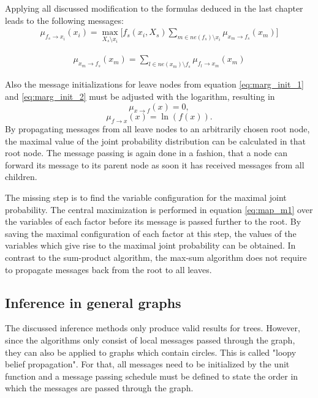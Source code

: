 \documentclass{sigkdd}
\begin{document}
Applying all discussed modification to the formulas deduced in the last chapter leads to the following messages:
\begin{equation}\label{eq:map_m1}
\begin{split}
\mu_{f_s \rightarrow x_i}(x_i) = \max_{X_s \setminus x_i} \Big[f_s(x_i, X_s) \sum_{m \in ne(f_s) \setminus x_i} \mu_{x_m \rightarrow f_s}(x_m) \Big]
\end{split}
\end{equation}

\begin{equation}\label{eq:map_m2}
\begin{split}
\mu_{x_m \rightarrow f_s}(x_m) = \sum_{l \in ne(x_m) \setminus f_s} \mu_{f_l \rightarrow x_m}(x_m)
\end{split}
\end{equation}

Also the message initializations for leave nodes from equation \ref{eq:marg_init_1} and \ref{eq:marg_init_2} must be adjusted with the logarithm, resulting in
\begin{equation}\label{eq:marg_init_1}
\mu_{x \rightarrow f}(x) = 0,
\end{equation}
\begin{equation}\label{eq:marg_init_2}
\mu_{f \rightarrow x}(x) = \ln(f(x)).
\end{equation}
By propagating messages from all leave nodes to an arbitrarily chosen root node, the maximal value of the joint probability distribution can be calculated in that root node. The message passing is again done in a fashion, that a node can forward its message to its parent node as soon it has received messages from all children.

The missing step is to find the variable configuration for the maximal joint probability. The central maximization is performed in equation \ref{eq:map_m1} over the variables of each factor before its message is passed further to the root. By saving the maximal configuration of each factor at this step, the values of the variables which give rise to the maximal joint probability can be obtained. In contrast to the sum-product algorithm, the max-sum algorithm does not require to propagate messages back from the root to all leaves.

\subsection{Inference in general graphs}
The discussed inference methods only produce valid results for trees. However, since the algorithms only consist of local messages passed through the graph, they can also be applied to graphs which contain circles. This is called "loopy belief propagation". For that, all messages need to be initialized by the unit function and a message passing schedule must be defined to state the order in which the messages are passed through the graph.
\end{document}
